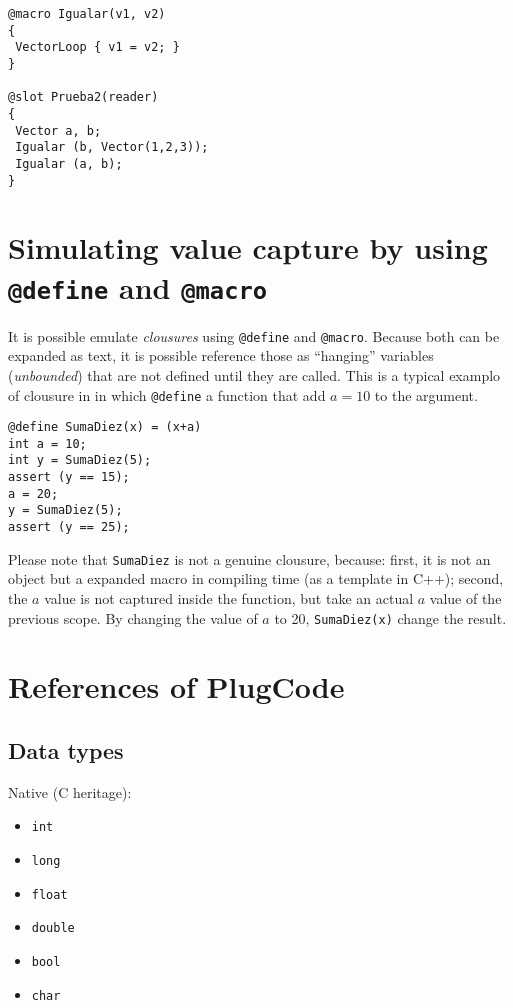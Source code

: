 \documentclass[a4paper,12pt]{article}
\begin{document}
\lstset{language=C}
\begin{lstlisting}
@macro Igualar(v1, v2)
{
 VectorLoop { v1 = v2; }
}

@slot Prueba2(reader)
{
 Vector a, b;
 Igualar (b, Vector(1,2,3));
 Igualar (a, b);
}
\end{lstlisting}

\section{Simulating value capture by using \texttt{@define} and \texttt{@macro}}

It is possible emulate \emph{clousures} using \texttt{@define} and
\texttt{@macro}. Because both can be expanded as text, it is possible reference
those as ``hanging'' variables (\emph{unbounded}) that are not defined until
they are called. This is a typical examplo of clousure in in which
\verb'@define' a function that add $a=10$ to the argument.

\lstset{language=C}
\begin{lstlisting}
@define SumaDiez(x) = (x+a)
int a = 10;
int y = SumaDiez(5);
assert (y == 15);
a = 20;
y = SumaDiez(5);
assert (y == 25);
\end{lstlisting}

Please note that \verb'SumaDiez' is not a genuine clousure, because: first, it
is not an object but a expanded macro in compiling time (as a template in C++);
second, the $a$ value is not captured inside the function, but take an actual
$a$ value of the previous scope. By changing the value of $a$ to 20,
\verb'SumaDiez(x)' change the result.


\section{References of PlugCode}

\subsection{Data types}

Native (C heritage):

\begin{itemize}
\item \verb'int'
\item \verb'long'
\item \verb'float'
\item \verb'double'
\item \verb'bool'
\item \verb'char'
\end{itemize}
\end{document}

